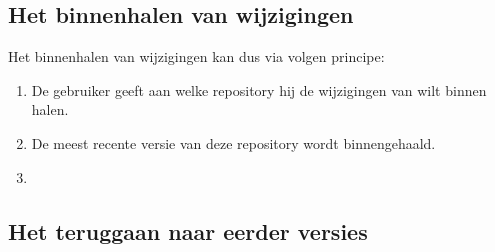 \subsection{Het binnenhalen van wijzigingen}
Het binnenhalen van wijzigingen kan dus via volgen principe:

\begin{enumerate}
\item De gebruiker geeft aan welke repository hij de wijzigingen van wilt binnen halen.
\item De meest recente versie van deze repository wordt binnengehaald.
\item 
\end{enumerate}
\subsection{Het teruggaan naar eerder versies}
